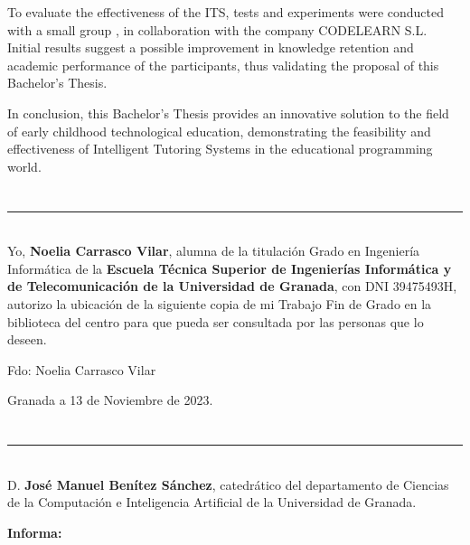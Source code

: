 To evaluate the effectiveness of the ITS, tests and experiments were conducted with a small group , in collaboration with the company CODELEARN S.L. Initial results suggest a possible improvement in knowledge retention and academic performance of the participants, thus validating the proposal of this Bachelor's Thesis.

In conclusion, this Bachelor's Thesis provides an innovative solution to the field of early childhood technological education, demonstrating the feasibility and effectiveness of Intelligent Tutoring Systems in the educational programming world.

\chapter*{}
\thispagestyle{empty}

\noindent\rule[-1ex]{\textwidth}{2pt}\\[4.5ex]

Yo, \textbf{Noelia Carrasco Vilar}, alumna de la titulación Grado en Ingeniería Informática de la \textbf{Escuela Técnica Superior
de Ingenierías Informática y de Telecomunicación de la Universidad de
Granada}, con DNI 39475493H, autorizo la
ubicación de la siguiente copia de mi Trabajo Fin de Grado en la biblioteca
del centro para que pueda ser
consultada por las personas que lo deseen.

\vspace{6cm}

\noindent Fdo: Noelia Carrasco Vilar

\vspace{2cm}

\begin{flushright}
Granada a 13 de Noviembre de 2023.
\end{flushright}


\chapter*{}
\thispagestyle{empty}

\noindent\rule[-1ex]{\textwidth}{2pt}\\[4.5ex]

D. \textbf{José Manuel Benítez Sánchez}, catedrático del departamento de Ciencias de la Computación e Inteligencia Artificial de la Universidad de Granada.


\vspace{0.5cm}

\textbf{Informa:}

